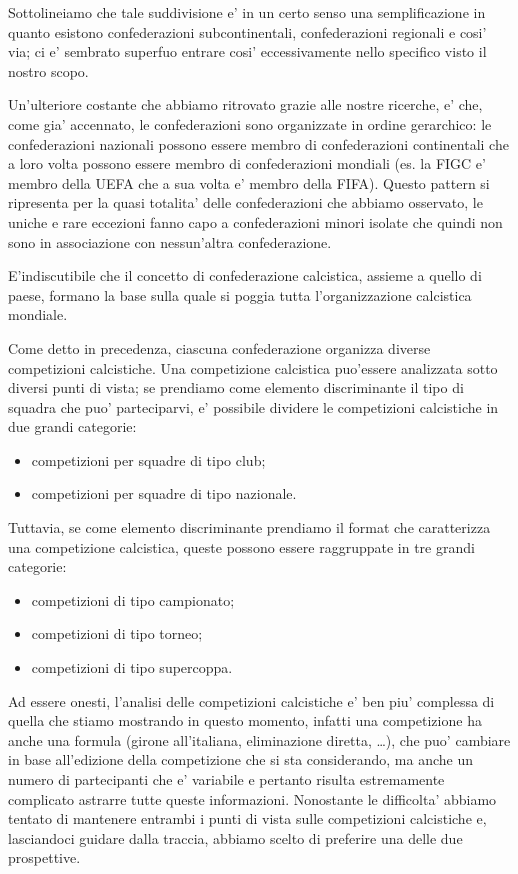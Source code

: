 Sottolineiamo che tale suddivisione e' in un certo senso una semplificazione in quanto
esistono confederazioni subcontinentali, confederazioni regionali e cosi' via; ci e' sembrato
superfuo entrare cosi' eccessivamente nello specifico visto il nostro scopo.

Un'ulteriore costante che abbiamo ritrovato grazie alle nostre ricerche, e' che,
come gia' accennato, le confederazioni sono organizzate in ordine gerarchico: le confederazioni
nazionali possono essere membro di confederazioni continentali che a loro volta possono essere
membro di confederazioni mondiali (es. la FIGC e' membro della UEFA che a sua volta e' membro
della FIFA).
Questo pattern si ripresenta per la quasi totalita' delle confederazioni che abbiamo osservato,
le uniche e rare eccezioni fanno capo a confederazioni minori isolate che quindi non sono in
associazione con nessun'altra confederazione.

E'indiscutibile che il concetto di confederazione calcistica, assieme a quello di paese,
formano la base sulla quale si poggia tutta l'organizzazione calcistica mondiale.

\bigskip
\bigskip

Come detto in precedenza, ciascuna confederazione organizza diverse competizioni calcistiche.
Una competizione calcistica puo'essere analizzata sotto diversi punti di vista;
se prendiamo come elemento discriminante il tipo di squadra che puo' parteciparvi, e' possibile
dividere le competizioni calcistiche in due grandi categorie:
\begin{itemize}
	\item competizioni per squadre di tipo club;
	\item competizioni per squadre di tipo nazionale.
\end{itemize}

Tuttavia, se come elemento discriminante prendiamo il format che caratterizza una competizione
calcistica, queste possono essere raggruppate in tre grandi categorie:
\begin{itemize}
	\item competizioni di tipo campionato;
	\item competizioni di tipo torneo;
	\item competizioni di tipo supercoppa.
\end{itemize}

Ad essere onesti, l'analisi delle competizioni calcistiche e' ben piu' complessa di quella
che stiamo mostrando in questo momento, infatti una competizione ha anche una formula
(girone all'italiana, eliminazione diretta, \dots),
che puo' cambiare in base all'edizione della competizione che si sta considerando,
ma anche un numero di partecipanti che e' variabile e pertanto risulta estremamente
complicato astrarre tutte queste informazioni.
Nonostante le difficolta' abbiamo tentato di mantenere entrambi i punti di vista sulle
competizioni calcistiche e, lasciandoci guidare dalla traccia, abbiamo scelto di preferire una
delle due prospettive.

